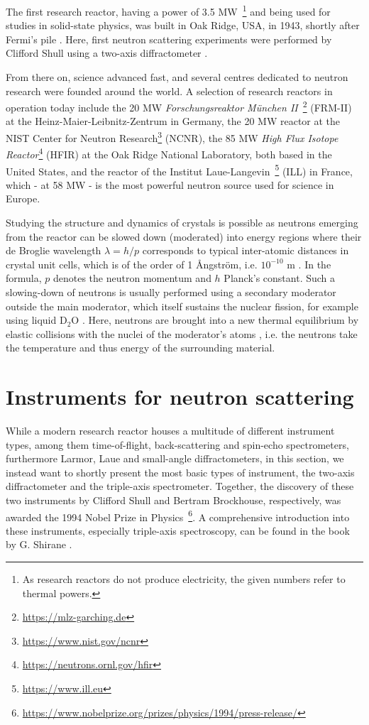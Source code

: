 The first research reactor, having a power of 3.5 MW~\footnote{As research reactors do not produce electricity, the given numbers refer to thermal powers.} and being used for studies in solid-state physics, was built in Oak Ridge, USA, in 1943, shortly after Fermi's pile \cite[p. 3]{Jacrot2021}.
Here, first neutron scattering experiments were performed by Clifford Shull using a two-axis diffractometer \cite[pp. 3, 37]{Jacrot2021}.

From there on, science advanced fast, and several centres dedicated to neutron research were founded around the world.
A selection of research reactors in operation today include the 20 MW \textit{Forschungsreaktor M\"unchen II}~\footnote{\url{https://mlz-garching.de}} (FRM-II) at the Heinz-Maier-Leibnitz-Zentrum in Germany, the 20 MW reactor at the NIST Center for Neutron Research\footnote{\url{https://www.nist.gov/ncnr}} (NCNR), the 85 MW \textit{High Flux Isotope Reactor}\footnote{\url{https://neutrons.ornl.gov/hfir}} (HFIR) at the Oak Ridge National Laboratory, both based in the United States, and the reactor of the Institut Laue-Langevin~\footnote{\url{https://www.ill.eu}} (ILL) in France, which - at 58 MW - is the most powerful neutron source used for science in Europe.

Studying the structure and dynamics of crystals is possible as neutrons emerging from the reactor can be slowed down (moderated) into energy regions where their de Broglie wavelength $\lambda = h/p$ corresponds to typical inter-atomic distances in crystal unit cells, which is of the order of 1 \AA{}ngstr\"om, i.e. $10^{-10}$ m \cite[pp.1,3]{Squires2012}. In the formula, $p$ denotes the neutron momentum and $h$ Planck's constant. Such a slowing-down of neutrons is usually performed using a secondary moderator outside the main moderator, which itself sustains the nuclear fission, for example using liquid $\mathrm{D_2O}$ \cite[p. 82]{Jacrot2021}. Here, neutrons are brought into a new thermal equilibrium by elastic collisions with the nuclei of the moderator's atoms \cite[p. 30]{Stacey2007}, i.e. the neutrons take the temperature and thus energy of the surrounding material.



\section{Instruments for neutron scattering \label{sec:instruments}}

While a modern research reactor houses a multitude of different instrument types, among them time-of-flight, back-scattering and spin-echo spectrometers, furthermore Larmor, Laue and small-angle diffractometers, in this section, we instead want to shortly present the most basic types of instrument, the two-axis diffractometer and the triple-axis spectrometer. Together, the discovery of these two instruments by Clifford Shull and Bertram Brockhouse, respectively, was awarded the 1994 Nobel Prize in Physics~\footnote{\url{https://www.nobelprize.org/prizes/physics/1994/press-release/}}. A comprehensive introduction into these instruments, especially triple-axis spectroscopy, can be found in the book by G. Shirane \cite{Shirane2002}.


